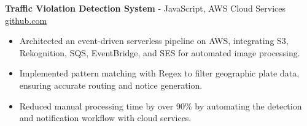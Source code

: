 \documentclass[11pt]{article}       %
\begin{document}

\textbf{Traffic Violation Detection System}{ - JavaScript, AWS Cloud Services} \hfill \href{https://github.com/Monica20030707/AWS_rekonigition-N-read-database}{github.com} \\
\vspace{-9pt}
\begin{itemize}
  \item Architected an event-driven serverless pipeline on AWS, integrating S3, Rekognition, SQS, EventBridge, and SES for automated image processing.
  \item Implemented pattern matching with Regex to filter geographic plate data, ensuring accurate routing and notice generation.
  \item Reduced manual processing time by over 90\% by automating the detection and notification workflow with cloud services.
\end{itemize}
\end{document}
